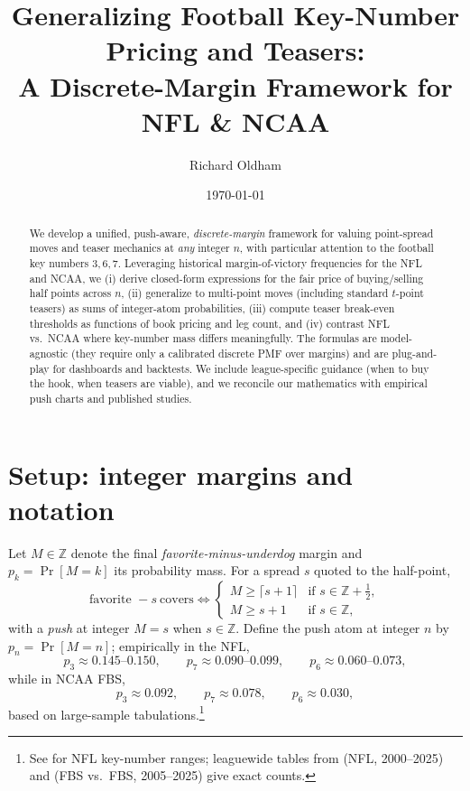 \documentclass[11pt]{amsart}
\title[Generalizing Key-Number Pricing and Teasers]{Generalizing Football Key-Number Pricing and Teasers: \\ A Discrete-Margin Framework for NFL \& NCAA}
\author{Richard Oldham}
\date{\today}
\begin{document}
\maketitle

\begin{abstract}
We develop a unified, push-aware, \emph{discrete-margin} framework for valuing point-spread moves and teaser mechanics at \emph{any} integer $n$, with particular attention to the football key numbers $3,6,7$. Leveraging historical margin-of-victory frequencies for the NFL and NCAA, we (i) derive closed-form expressions for the fair price of buying/selling half points across $n$, (ii) generalize to multi-point moves (including standard $t$-point teasers) as sums of integer-atom probabilities, (iii) compute teaser break-even thresholds as functions of book pricing and leg count, and (iv) contrast NFL vs.\ NCAA where key-number mass differs meaningfully. The formulas are model-agnostic (they require only a calibrated discrete PMF over margins) and are plug-and-play for dashboards and backtests. We include league-specific guidance (when to buy the hook, when teasers are viable), and we reconcile our mathematics with empirical push charts and published studies.
\end{abstract}

\section{Setup: integer margins and notation}
Let $M\in\mathbb{Z}$ denote the final \emph{favorite-minus-underdog} margin and $p_k=\Pr[M=k]$ its probability mass. For a spread $s$ quoted to the half-point,
\[
\text{favorite }-s\ \text{covers}\iff 
\begin{cases}
M\ge \lceil s+1\rceil & \text{if $s\in\mathbb{Z}+\tfrac12$},\\[2pt]
M\ge s+1 & \text{if $s\in\mathbb{Z}$},
\end{cases}
\]
with a \emph{push} at integer $M=s$ when $s\in\mathbb{Z}$. Define the push atom at integer $n$ by $p_n=\Pr[M=n]$; empirically in the NFL,
\[
p_3\approx 0.145\text{--}0.150,\qquad p_7\approx 0.090\text{--}0.099,\qquad p_6\approx 0.060\text{--}0.073,
\]
while in NCAA FBS,
\[
p_3\approx 0.092,\qquad p_7\approx 0.078,\qquad p_6\approx 0.030,
\]
based on large-sample tabulations.\footnote{See \cite{Action-KeyNumbers-2024,Covers-KeyNumbers-2025,Boyds-KeyNumbers} for NFL key-number ranges; leaguewide tables from \cite{CleanupHitter-NFL} (NFL, 2000--2025) and \cite{CleanupHitter-CFB} (FBS vs.\ FBS, 2005--2025) give exact counts.\label{fn:data}}
\end{document}
